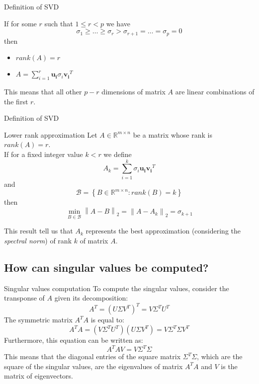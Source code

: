 \documentclass[10pt]{beamer}
\begin{document}
\begin{frame}{Definition of SVD}
    \begin{theorem}
        If for some $r$ such that $ 1 \le r < p $ we have
        $$ \sigma_1 \ge \ldots \ge \sigma_{r} > \sigma_{r + 1} = \ldots = \sigma_p = 0  $$
        then
        \begin{itemize}
            \item $rank(A) = r$
            \item $ A = \sum \limits_{i = 1}^{r} \bm{u_i} \sigma_i \bm{v_i}^T $
        \end{itemize}
    \end{theorem}

    This means that all other $p-r$ dimensions of matrix $A$ are linear combinations of the first $r$.
\end{frame}

\begin{frame}{Definition of SVD}
    \begin{block}{Lower rank approximation}
        Let $A \in \mathbb{R}^{m \times n}$ be a matrix whose rank is $rank(A) = r$. \\
        If for a fixed integer value $k < r$ we define
        \begin{equation}
            \label{eq:lower_rank}
            A_k = \sum \limits_{i = 1}^{k} \sigma_i \bm{u_i}  \bm{v_i}^T 
        \end{equation}
        and
        $$ \mathcal{B} = \left\{ B \in \mathbb{R}^{m \times n} : rank(B) = k \right\}$$
        then 
        $$ \min_{B \in \mathcal{B}} \left\lVert A - B \right\rVert _2 = \left\lVert A - A_k \right\rVert _2 = \sigma_{k + 1} $$
    \end{block}
        
    This result tell us that $A_k$ represents the best approximation (considering the \textit{spectral norm}) of rank $k$ of matrix $A$.
\end{frame}

\subsection{How can singular values be computed?}

\begin{frame}{Singular values computation}
    To compute the singular values, consider the transponse of $A$ given its decomposition:
    $$ A^T = (U \Sigma V^T)^T = V \Sigma^T U^T$$
    The symmetric matrix $A^T A$ is equal to:
    $$ A^T A = ( V \Sigma^T U^T )(U \Sigma V^T) = V \Sigma^T \Sigma V^T$$
    Furthermore, this equation can be written as:
    $$ A^T A V = V \Sigma^T \Sigma $$
    This means that the diagonal entries of the square matrix $ \Sigma^T \Sigma $, which are the square of the singular values, are the eigenvalues of matrix $A^T A$ and $ V $ is the matrix of eigenvectors.
\end{frame}
\end{document}

